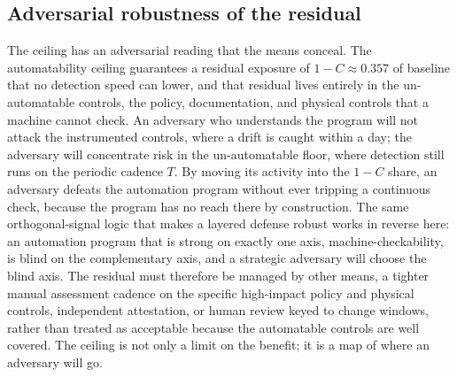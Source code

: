 \documentclass[journal]{IEEEtran}
\begin{document}
\begin{table}[t]
\centering
\caption{Drift concentration: reduction captured by the highest-drift quartile of controls (mean
over 25 seeds, 95\% BCa interval), against the uniform-share benchmark.}
\label{tab:concentration}
\footnotesize
\setlength{\tabcolsep}{4pt}
\end{table}

\subsection{Adversarial robustness of the residual}
The ceiling has an adversarial reading that the means conceal. The automatability ceiling guarantees
a residual exposure of $1 - C \approx 0.357$ of baseline that no detection speed can lower, and that
residual lives entirely in the un-automatable controls, the policy, documentation, and physical
controls that a machine cannot check. An adversary who understands the program will not attack the
instrumented controls, where a drift is caught within a day; the adversary will concentrate risk in the
un-automatable floor, where detection still runs on the periodic cadence $T$. By moving its activity
into the $1 - C$ share, an adversary defeats the automation program without ever tripping a
continuous check, because the program has no reach there by construction. The same orthogonal-signal
logic that makes a layered defense robust works in reverse here: an automation program that is
strong on exactly one axis, machine-checkability, is blind on the complementary axis, and a
strategic adversary will choose the blind axis. The residual must therefore be managed by other
means, a tighter manual assessment cadence on the specific high-impact policy and physical controls,
independent attestation, or human review keyed to change windows, rather than treated as acceptable
because the automatable controls are well covered. The ceiling is not only a limit on the benefit;
it is a map of where an adversary will go.
\end{document}
